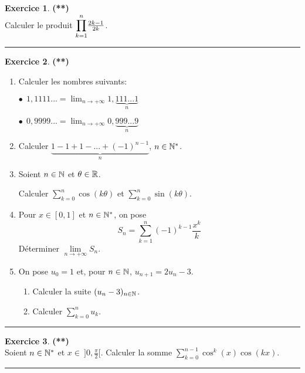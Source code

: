 \documentclass[a4paper,11pt]{article}
\theoremstyle{definition}
\newtheorem{exo}{Exercice} %
\begin{document}
\begin{minipage}{1\linewidth}
\begin{minipage}[t]{0.48\linewidth}
\begin{exo}\textbf{(**)}\quad\\[0.2cm]
	Calculer le produit $\mathlarger\prod\limits_{k=1}^{n}\frac{2k-1}{2k}$.
	
	
	\centering
	\rule{1\linewidth}{0.6pt}
\end{exo}


\begin{exo}\textbf{(**)}\quad\\[0.2cm]
	\begin{enumerate}

		
		\item  Calculer les nombres suivants:
		
		 $\bullet \ \ 1,1111...=\lim_{n\rightarrow +\infty}1,\underbrace{111...1}_n$ 
		 
		$ \bullet \ \  0,9999...=\lim_{n\rightarrow +\infty}0,\underbrace{999...9}_n$
		
		\item Calculer $\underbrace{1-1+1-...+(-1)^{n-1}}_n$,
		$n\in\mathbb{N}^*$.
		

		\item Soient $n\in\mathbb{N}$ et $\theta\in\mathbb{R}$.
		
		 Calculer $\sum\limits_{k=0}^{n}\cos(k\theta)$ et
		$\sum\limits_{k=0}^{n}\sin(k\theta)$.
		
		\item  Pour $x\in[0,1]$ et $n\in\mathbb{N}^*$, on pose
		$$S_n=\sum_{k=1}^{n}(-1)^{k-1}\frac{x^k}{k}$$ Déterminer $\lim\limits_{n\rightarrow +\infty}S_n$.
		
		\item  On pose $u_0=1$ et, pour $n\in\mathbb{N}$, $u_{n+1}=2u_n-3$.
		\begin{enumerate}
			\item Calculer la suite $(u_n-3)_{n\in\mathbb{N}}$.
			\item Calculer $\sum_{k=0}^{n}u_k$.
		\end{enumerate}
	\end{enumerate}

	
	
	\centering
	\rule{1\linewidth}{0.6pt}
\end{exo}



\begin{exo}\textbf{(**)}\quad\\[0.2cm]
	 Soient $n \in \mathbb{N}^*$ et $x \in \ ]0 , \frac{\pi}{2}[$. Calculer la
	somme $\displaystyle \sum_{k=0}^{n-1} \cos^k (x) \cos(kx)$.
	
	
	\centering
	\rule{1\linewidth}{0.6pt}
\end{exo}



\end{minipage}
\end{minipage}
\end{document}
